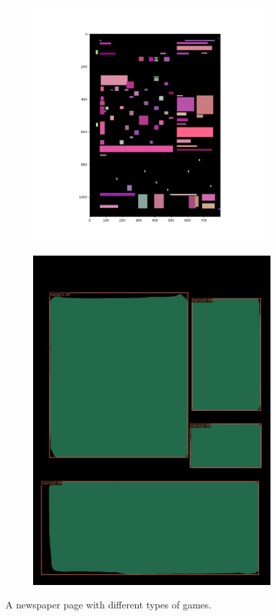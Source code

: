 \documentclass[aspectratio=1610]{beamer}
\begin{document}
\begin{frame}
  \begin{figure}
\centering
\begin{subfigure}{.5\textwidth}
  \centering
  \includegraphics[width=0.7\linewidth, clip=true, trim = 50mm 20mm 60mm 0mm]{figures/tf/y3LXnnL.png}
\end{subfigure}%
\begin{subfigure}{.5\textwidth}
  \centering
  \includegraphics[width=0.7\linewidth, clip=true, trim = 0mm 0mm 0mm 0mm]{figures/labels-vanilla-0.75/y3LXnnL.jpg}
\end{subfigure}
\caption{A newspaper page with different types of games.}
\label{fig:stocks}
\end{figure}
\end{frame}
\normalpage
\end{document}
